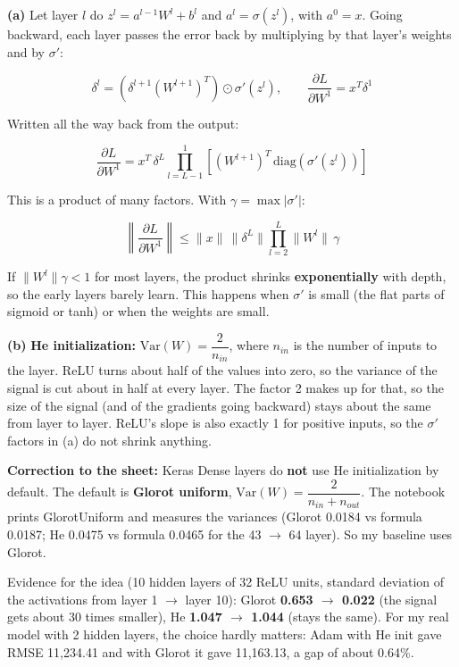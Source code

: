 \documentclass[12pt,a4paper]{article}
\begin{document}
\begin{answerbox}
\textbf{(a)} Let layer \(l\) do \(z^l = a^{l-1}W^l + b^l\) and \(a^l=\sigma(z^l)\), with \(a^0=x\). Going backward, each layer passes the error back by multiplying by that layer's weights and by \(\sigma'\):

\[\delta^l=\left(\delta^{l+1}(W^{l+1})^T\right)\odot\sigma'(z^l),\qquad \frac{\partial L}{\partial W^1}=x^T\delta^1\]

Written all the way back from the output:

\[\frac{\partial L}{\partial W^1}=x^T\,\delta^L\prod_{l=L-1}^{1}\left[(W^{l+1})^T\,\text{diag}\!\left(\sigma'(z^l)\right)\right]\]

This is a product of many factors. With \(\gamma=\max|\sigma'|\):

\[\left\|\frac{\partial L}{\partial W^1}\right\|\le\|x\|\,\|\delta^L\|\prod_{l=2}^{L}\|W^l\|\,\gamma\]

If \(\|W^l\|\gamma<1\) for most layers, the product shrinks \textbf{exponentially} with depth, so the early layers barely learn. This happens when \(\sigma'\) is small (the flat parts of sigmoid or tanh) or when the weights are small.

\textbf{(b)} \textbf{He initialization:} \(\text{Var}(W)=\dfrac{2}{n_{in}}\), where \(n_{in}\) is the number of inputs to the layer. ReLU turns about half of the values into zero, so the variance of the signal is cut about in half at every layer. The factor 2 makes up for that, so the size of the signal (and of the gradients going backward) stays about the same from layer to layer. ReLU's slope is also exactly 1 for positive inputs, so the \(\sigma'\) factors in (a) do not shrink anything.

\textbf{Correction to the sheet:} Keras Dense layers do \textbf{not} use He initialization by default. The default is \textbf{Glorot uniform}, \(\text{Var}(W)=\dfrac{2}{n_{in}+n_{out}}\). The notebook prints GlorotUniform and measures the variances (Glorot 0.0184 vs formula 0.0187; He 0.0475 vs formula 0.0465 for the 43 \(\to\) 64 layer). So my baseline uses Glorot.

Evidence for the idea (10 hidden layers of 32 ReLU units, standard deviation of the activations from layer 1 \(\to\) layer 10): Glorot \textbf{0.653 \(\to\) 0.022} (the signal gets about 30 times smaller), He \textbf{1.047 \(\to\) 1.044} (stays the same). For my real model with 2 hidden layers, the choice hardly matters: Adam with He init gave RMSE 11,234.41 and with Glorot it gave 11,163.13, a gap of about 0.64\%.


\end{answerbox}
\end{document}
